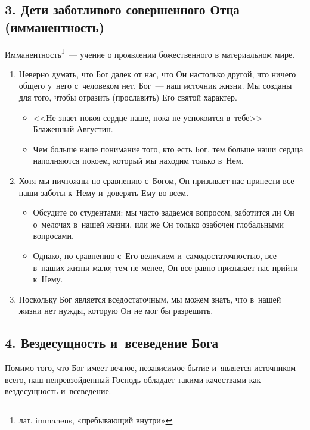 \documentclass[a4paper,12pt]{article}
\begin{document}
\subsection{3. Дети заботливого совершенного Отца (имманентность)}

Имманентность\footnote{лат. immanens, «пребывающий внутри»}~--- учение о проявлении божественного в материальном мире.

\begin{enumerate}
    \item Неверно думать, что Бог далек от нас, что Он настолько другой, что ничего общего у~него с~человеком нет. Бог~--- наш источник жизни. Мы созданы для того, чтобы отразить (прославить) Его святой характер.
    \begin{itemize}
        \item <<Не знает покоя сердце наше, пока не успокоится в~тебе>>~--- Блаженный Августин. 
        \item Чем больше наше понимание того, кто есть Бог, тем больше наши сердца наполняются покоем, который мы находим только в~Нем.
    \end{itemize}
    \item Хотя мы ничтожны по сравнению с~Богом, Он призывает нас принести все наши заботы к~Нему и~доверять Ему во всем.
    \begin{itemize}
        \item Обсудите со студентами: мы часто задаемся вопросом, заботится ли Он о~мелочах в~нашей жизни, или же Он только озабочен глобальными вопросами.
        \item Однако, по сравнению с~Его величием и~самодостаточностью, все в~наших жизни мало; тем не менее, Он все равно призывает нас прийти к~Нему.
    \end{itemize}
    \item Поскольку Бог является вседостаточным, мы можем знать, что в~нашей жизни нет нужды, которую Он не мог бы разрешить.
\end{enumerate}

\subsection{4. Вездесущность и~всеведение Бога}

Помимо того, что Бог имеет вечное, независимое бытие и~является источником всего, наш непревзойденный Господь обладает такими качествами как вездесущность и~всеведение. 
\end{document}
